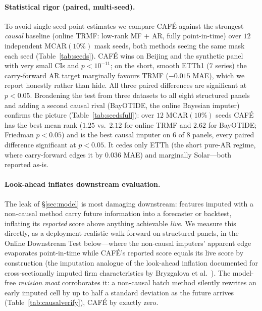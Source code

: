 \documentclass[10pt,twocolumn]{article}
\newcommand{\cafe}{CAF\'E}
\begin{document}
\paragraph{Statistical rigor (paired, multi-seed).} To avoid single-seed point
estimates we compare \cafe{} against the strongest \emph{causal} baseline (online
TRMF: low-rank MF $+$ AR, fully point-in-time) over $12$ independent MCAR$(10\%)$
mask seeds, both methods seeing the same mask each seed (Table~\ref{tab:seeds}).
\cafe{} wins on Beijing and the synthetic panel with very small CIs and
$p<10^{-11}$; on the short, smooth ETTh1 ($7$ series) the carry-forward AR target
marginally favours TRMF ($-0.015$ MAE), which we report honestly rather than
hide. All three paired differences are significant at $p<0.05$.
Broadening the test from three datasets to all eight structured panels and adding a
second causal rival (BayOTIDE, the online Bayesian imputer) confirms the picture
(Table~\ref{tab:seedsfull}): over $12$ MCAR$(10\%)$ seeds \cafe{} has the best mean
rank ($1.25$ vs.\ $2.12$ for online TRMF and $2.62$ for BayOTIDE; Friedman $p<0.05$)
and is the best causal imputer on $6$ of $8$ panels, every paired difference
significant at $p<0.05$. It cedes only ETTh (the short pure-AR regime, where
carry-forward edges it by $0.036$ MAE) and marginally Solar---both reported as-is.



\paragraph{Look-ahead inflates downstream evaluation.} The leak of
\S\ref{sec:model} is most damaging downstream: features imputed with a non-causal
method carry future information into a forecaster or backtest, inflating its
\emph{reported} score above anything achievable \emph{live}. We measure this
directly, as a deployment-realistic walk-forward on structured panels, in the
Online Downstream Test below---where the non-causal imputers' apparent edge
evaporates point-in-time while \cafe{}'s reported score equals its live score by
construction (the imputation analogue of the look-ahead inflation documented for
cross-sectionally imputed firm characteristics by Bryzgalova et
al.~\cite{bryzgalova2025missing}). The model-free \emph{revision moat} corroborates
it: a non-causal batch method silently rewrites an early imputed cell by up to half
a standard deviation as the future arrives (Table~\ref{tab:causalverify}), \cafe{}
by exactly zero.
\end{document}
